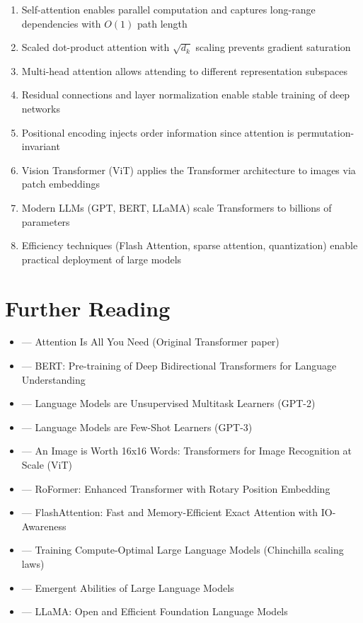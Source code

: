 \begin{enumerate}
    \item Self-attention enables parallel computation and captures long-range dependencies with $O(1)$ path length
    \item Scaled dot-product attention with $\sqrt{d_k}$ scaling prevents gradient saturation
    \item Multi-head attention allows attending to different representation subspaces
    \item Residual connections and layer normalization enable stable training of deep networks
    \item Positional encoding injects order information since attention is permutation-invariant
    \item Vision Transformer (ViT) applies the Transformer architecture to images via patch embeddings
    \item Modern LLMs (GPT, BERT, LLaMA) scale Transformers to billions of parameters
    \item Efficiency techniques (Flash Attention, sparse attention, quantization) enable practical deployment of large models
\end{enumerate}

\section{Further Reading}

\begin{itemize}
    \item \cite{vaswani2017attention} --- Attention Is All You Need (Original Transformer paper)
    \item \cite{devlin2018bert} --- BERT: Pre-training of Deep Bidirectional Transformers for Language Understanding
    \item \cite{radford2019language} --- Language Models are Unsupervised Multitask Learners (GPT-2)
    \item \cite{brown2020language} --- Language Models are Few-Shot Learners (GPT-3)
    \item \cite{dosovitskiy2020image} --- An Image is Worth 16x16 Words: Transformers for Image Recognition at Scale (ViT)
    \item \cite{su2021roformer} --- RoFormer: Enhanced Transformer with Rotary Position Embedding
    \item \cite{dao2022flashattention} --- FlashAttention: Fast and Memory-Efficient Exact Attention with IO-Awareness
    \item \cite{hoffmann2022training} --- Training Compute-Optimal Large Language Models (Chinchilla scaling laws)
    \item \cite{wei2022emergent} --- Emergent Abilities of Large Language Models
    \item \cite{touvron2023llama} --- LLaMA: Open and Efficient Foundation Language Models
\end{itemize}

